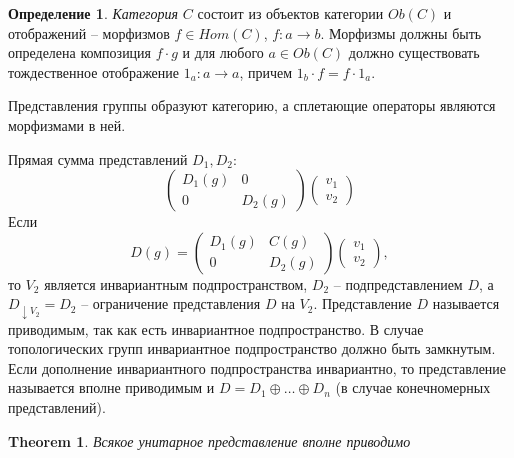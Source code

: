 \documentclass[a4paper,12pt]{article}
\newtheorem{theorem}{Theorem}
\theoremstyle{definition}
\theoremstyle{definition}
\theoremstyle{definition}
\newtheorem{definition}{Определение}
\theoremstyle{definition}
\begin{document}
\begin{definition}
  {\it Категория} $C$ состоит из объектов категории $Ob(C)$ и отображений -- морфизмов $f\in
  Hom(C)$, $f:a\to b$. Морфизмы должны быть определена композиция $f\cdot g$ и для любого $a\in
  Ob(C)$ должно существовать тождественное отображение $1_{a}:a\to a$, причем $1_{b}\cdot f=f\cdot
  1_{a}$.
\end{definition}

Представления группы образуют категорию, а сплетающие операторы являются морфизмами в ней. 

Прямая сумма представлений $D_{1}, D_{2}$:
\begin{equation}
  \label{eq:5}
  \begin{pmatrix}
    D_{1}(g) & 0 \\
    0 & D_{2}(g)
  \end{pmatrix} 
  \begin{pmatrix}
    v_{1}\\ v_{2}
  \end{pmatrix}
\end{equation}
Если
\begin{equation}
  \label{eq:6}
  D(g)=
  \begin{pmatrix}
    D_{1}(g) & C(g) \\
    0 & D_{2}(g)
  \end{pmatrix} 
  \begin{pmatrix}
    v_{1}\\ v_{2}
  \end{pmatrix},
\end{equation}
то $V_{2}$ является инвариантным подпространством, $D_{2}$ -- подпредставлением $D$, а
$D_{\downarrow V_{2}}=D_{2}$ -- ограничение представления $D$ на $V_{2}$. Представление $D$
называется приводимым, так как есть инвариантное подпространство. В случае топологических групп
инвариантное подпространство должно быть замкнутым. Если дополнение инвариантного подпространства
инвариантно, то представление называется вполне приводимым и $D=D_{1}\oplus \dots\oplus D_{n}$ (в
случае конечномерных представлений).

\begin{theorem}
  Всякое унитарное представление вполне приводимо
\end{theorem}
\end{document}
